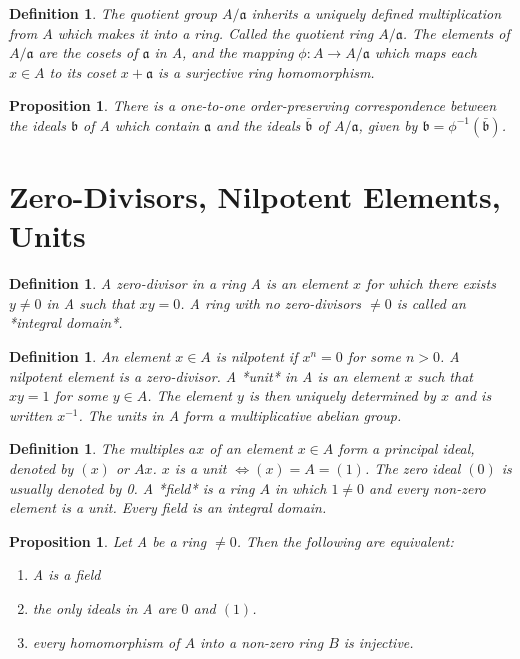 \documentclass[]{report}
\newtheorem{prop}[theorem]{Proposition}
\newtheorem{defn}[theorem]{Definition}
\begin{document}
\begin{defn}
    The quotient group $A/\mathfrak{a}$ inherits a uniquely defined multiplication from $A$ which makes it into a ring. Called the quotient ring $A/\mathfrak{a}$. The elements of $A/\mathfrak{a}$ are the cosets of $\mathfrak{a}$ in A, and the mapping $\phi: A\rightarrow A/\mathfrak{a}$ which maps each $x\in A$ to its coset $x+\mathfrak{a}$ is a surjective ring homomorphism.
\end{defn}

\begin{prop}
    There is a one-to-one order-preserving correspondence between the ideals $\mathfrak{b}$ of A which contain $\mathfrak{a}$ and the ideals $\bar{\mathfrak{b}}$  of $A/\mathfrak{a}$, given by $\mathfrak{b} = \phi^{-1}(\bar{\mathfrak{b}})$.
\end{prop}

\section{Zero-Divisors, Nilpotent Elements, Units}

\begin{defn}
    A zero-divisor in a ring A is an element $x$ for which there exists $y\neq 0$ in A such that $xy=0$. A ring with no zero-divisors $\neq 0$ is called an *integral domain*.
\end{defn}

\begin{defn}
    An element $x\in A$ is nilpotent if $x^n=0$ for some $n>0$. A nilpotent element is a zero-divisor. A *unit* in A is an element $x$ such that $xy=1$ for some $y\in A$. The element $y$ is then uniquely determined by $x$ and is written $x^{-1}$. The units in A form a multiplicative abelian group.
\end{defn}

\begin{defn}
    The multiples $ax$ of an element $x\in A$ form a principal ideal, denoted by $(x)$ or $Ax$. $x$ is a unit $\Leftrightarrow (x) = A = (1)$. The zero ideal $(0)$ is usually denoted by 0. A *field* is a ring $A$ in which $1\neq 0$ and every non-zero element is a unit. Every field is an integral domain. 
\end{defn}

\begin{prop}
    Let A be a ring $\neq 0$. Then the following are equivalent:
    \begin{enumerate}
        \item A is a field
        \item the only ideals in A are $0$ and $(1)$.
        \item every homomorphism of $A$ into a non-zero ring $B$ is injective.
    \end{enumerate}
\end{prop}
\end{document}
